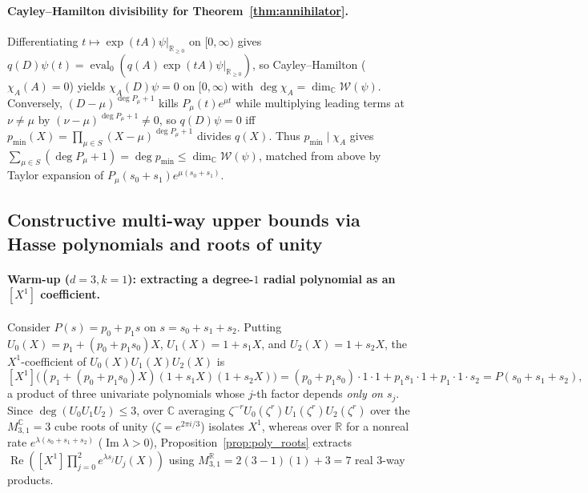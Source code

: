 \documentclass[11pt,a4paper]{article}
\theoremstyle{plain}
\theoremstyle{definition}
\newcommand{\R}{\mathbb{R}}
\newcommand{\C}{\mathbb{C}}
\newcommand{\Rnn}{\mathbb{R}_{\ge 0}}
\DeclareMathOperator{\RePart}{Re}
\DeclareMathOperator{\ImPart}{Im}
\begin{document}
\paragraph{Cayley--Hamilton divisibility for Theorem~\ref{thm:annihilator}.}
Differentiating $t \mapsto \exp(tA)\psi|_{\Rnn}$ on $[0,\infty)$ gives $q(D)\psi(t) = \operatorname{eval}_0(q(A)\exp(tA)\psi|_{\Rnn})$, so Cayley--Hamilton ($\chi_A(A) = 0$) yields $\chi_A(D)\psi = 0$ on $[0,\infty)$ with $\deg\chi_A = \dim_{\C}\mathcal{W}(\psi)$. Conversely, $(D - \mu)^{\deg P_\mu + 1}$ kills $P_\mu(t)e^{\mu t}$ while multiplying leading terms at $\nu \ne \mu$ by $(\nu - \mu)^{\deg P_\mu + 1} \ne 0$, so $q(D)\psi = 0$ iff $p_{\min}(X) = \prod_{\mu \in S}(X - \mu)^{\deg P_\mu + 1}$ divides $q(X)$. Thus $p_{\min} \mid \chi_A$ gives $\sum_{\mu \in S}(\deg P_\mu + 1) = \deg p_{\min} \le \dim_{\C}\mathcal{W}(\psi)$, matched from above by Taylor expansion of $P_\mu(s_0 + s_1)e^{\mu(s_0+s_1)}$.

\subsection{Constructive multi-way upper bounds via Hasse polynomials and roots of unity}\label{sec:ub}

\paragraph{Warm-up ($d = 3, k = 1$): extracting a degree-$1$ radial polynomial as an $[X^1]$ coefficient.}
Consider $P(s) = p_0 + p_1 s$ on $s = s_0 + s_1 + s_2$. Putting $U_0(X) = p_1 + (p_0 + p_1 s_0)X$, $U_1(X) = 1 + s_1 X$, and $U_2(X) = 1 + s_2 X$, the $X^1$-coefficient of $U_0(X)U_1(X)U_2(X)$ is
\[
  [X^1]\bigl((p_1 + (p_0 + p_1 s_0)X)(1 + s_1 X)(1 + s_2 X)\bigr)
  = (p_0 + p_1 s_0)\cdot 1\cdot 1 + p_1 s_1\cdot 1 + p_1\cdot 1\cdot s_2
  = P(s_0 + s_1 + s_2),
\]
a product of three univariate polynomials whose $j$-th factor depends \emph{only on $s_j$}. Since $\deg(U_0 U_1 U_2) \le 3$, over $\C$ averaging $\zeta^{-r} U_0(\zeta^r)U_1(\zeta^r)U_2(\zeta^r)$ over the $M_{3,1}^{\C} = 3$ cube roots of unity ($\zeta = e^{2\pi i/3}$) isolates $X^1$, whereas over $\R$ for a nonreal rate $e^{\lambda(s_0+s_1+s_2)}$ ($\ImPart\lambda > 0$), Proposition~\ref{prop:poly_roots} extracts $\RePart([X^1]\prod_{j=0}^2 e^{\lambda s_j}U_j(X))$ using $M_{3,1}^{\R} = 2(3-1)(1) + 3 = 7$ real 3-way products.
\end{document}
